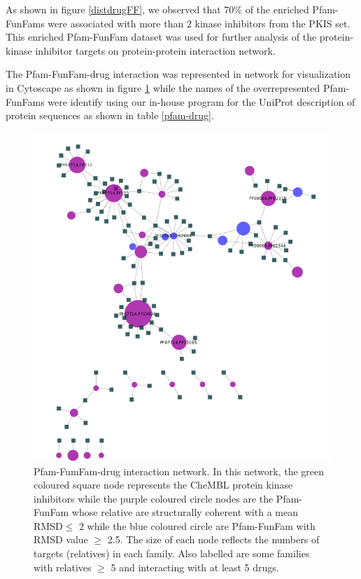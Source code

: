 \documentclass[a4paper, 11pt]{article}
\newcommand{\redcomment}[1]{\textcolor{red}{[#1]}} %
\begin{document}
As shown in figure \ref{distdrugFF}, we observed that 70\% of the enriched Pfam-FunFams were associated with more than 2 kinase inhibitors from the PKIS set. This enriched Pfam-FunFam dataset was used for further analysis of the protein-kinase inhibitor targets on protein-protein interaction network.\par
The Pfam-FunFam-drug interaction was represented in network for visualization in Cytoscape as shown in figure \ref{pfam-chembl} while the names of the overrepresented Pfam-FunFams were identify using our in-house program for the UniProt description  of protein sequences as shown in table \ref{pfam-drug}.
\begin{figure}[H]
	\includegraphics[width=.9\linewidth]{figures/pfam_chembl.png}
	\centering
	\caption{Pfam-FumFam-drug interaction network. In this network, the green coloured square node represents the CheMBL protein kinase inhibitors while the purple coloured circle nodes are the Pfam-FunFam whose relative are structurally coherent with a mean RMSD$\leq$ 2 while the blue coloured circle are Pfam-FunFam with RMSD value $\geq$ 2.5. The size of each node reflects the numbers of targets (relatives)
in each family. Also labelled are some families with relatives  $\geq$ 5 and interacting with at least 5 drugs.}
	\label{pfam-chembl}
\end{figure}
\end{document}
